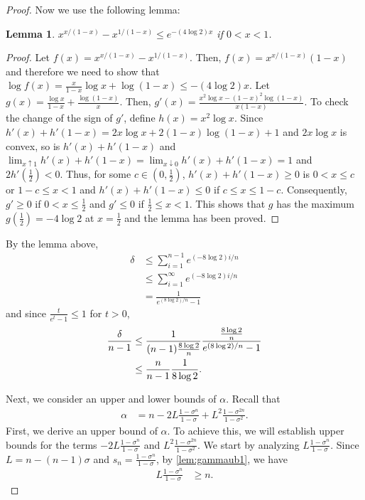 \documentclass{article}
\theoremstyle{plain}
\newtheorem{lemma}[theorem]{Lemma}
\theoremstyle{definition}
\theoremstyle{remark}
\def\bigopen#1{\left(#1\right)}
\begin{document}
\begin{proof}
Now we use the following lemma:
\begin{lemma}
$x^{x/(1-x)}-x^{1/(1-x)} \le e^{-(4\log 2)x}$ if $0<x<1$.
\end{lemma}
\begin{proof}
Let $f(x)=x^{x/(1-x)}-x^{1/(1-x)}$. Then, $f(x)=x^{x/(1-x)}(1-x)$ and therefore we need to show that $\log f(x)=\frac{x}{1-x}\log x + \log(1-x)\le -(4\log 2)x$. Let $g(x)=\frac{\log x}{1-x}+\frac{\log(1-x)}{x}$. Then, $g'(x)=\frac{x^2\log x-(1-x)^2\log(1-x)}{x(1-x)}$. To check the change of the sign of $g'$, define $h(x)=x^2\log x$. Since $h'(x)+h'(1-x)=2x\log x+2(1-x)\log(1-x)+1$ and $2x\log x$ is convex, so is $h'(x)+h'(1-x)$ and $\lim_{x \uparrow 1}h'(x)+h'(1-x) = \lim_{x \downarrow 0}h'(x)+h'(1-x) =1$ and $2h'(\frac{1}{2})<0$. Thus, for some $c\in (0, \frac{1}{2})$, $h'(x)+h'(1-x)\ge 0$ is $0<x\le c$ or $1-c\le x<1$ and $h'(x)+h'(1-x)\le 0$ if $c\le x \le 1-c$. Consequently, $g'\ge 0$ if $0<x\le \frac{1}{2}$ and $g'\le 0$ if $\frac{1}{2}\le x <1$. This shows that $g$ has the maximum $g\bigopen{ \frac{1}{2} } = -4\log 2$ at $x=\frac{1}{2}$ and the lemma has been proved.
\end{proof}

By the lemma above, 
\begin{align*}
    \delta &\le \sum_{i=1}^{n-1} e^{(-8\log 2)i/n}\\
    &\le \sum_{i=1}^{\infty} e^{(-8\log 2)i/n}\\
    &= \frac{1}{e^{(8\log 2)/n}-1}
\end{align*} and since $\frac{t}{e^t-1}\le 1$ for $t > 0$, 
\begin{align}
    \frac{\delta}{n-1} &\le \frac{1}{(n-1) \frac{8\log 2}{n}} \frac{\frac{8\log 2}{n}}{e^{(8\log 2)/n}-1} \notag \\
    &\le \frac{n}{n-1} \frac{1}{8\log 2}. \label{eq:deltaub}
\end{align}

Next, we consider an upper and lower bounds of $\alpha$. Recall that
\begin{align*}
    \alpha &= n-2L \frac{1-\sigma^n}{1-\sigma} + L^2 \frac{1-\sigma^{2n}}{1-\sigma^2}.
\end{align*}
First, we derive an upper bound of $\alpha$. To achieve this, we will establish upper bounds for the terms $-2L \frac{1-\sigma^n}{1-\sigma}$ and $L^2 \frac{1-\sigma^{2n}}{1-\sigma^2}$. We start by analyzing $L \frac{1-\sigma^n}{1-\sigma}$. Since $L=n-(n-1)\sigma$ and $s_n=\frac{1-\sigma^n}{1-\sigma}$, by \cref{lem:gammaub1}, we have 
\begin{align}
    \label{eq:alphaub1}
    L \frac{1-\sigma^n}{1-\sigma} &\ge n.
\end{align}


\end{proof}
\end{document}
